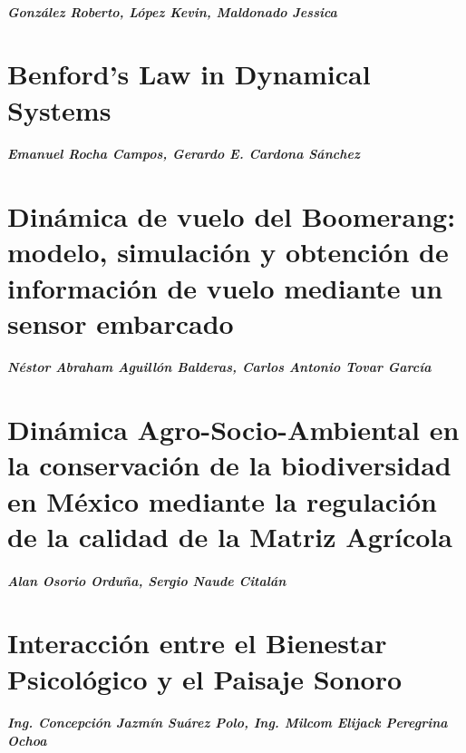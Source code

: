     \paragraph{González Roberto, López Kevin, Maldonado Jessica}
    

    \chapter{Benford's Law in Dynamical Systems}
    \paragraph{Emanuel Rocha Campos, Gerardo E. Cardona Sánchez}
    

    \chapter{Dinámica de vuelo del Boomerang: modelo, simulación y obtención de información de vuelo mediante un sensor embarcado}
    \paragraph{Néstor Abraham Aguillón Balderas, Carlos Antonio Tovar García}
    

    \chapter{Dinámica Agro-Socio-Ambiental en la conservación de la biodiversidad en México mediante la regulación de la calidad de la Matriz Agrícola}
    \paragraph{Alan Osorio Orduña, Sergio Naude Citalán}
    

    \chapter{Interacción entre el Bienestar Psicológico y el Paisaje Sonoro}
    \paragraph{Ing. Concepción Jazmín Suárez Polo, Ing. Milcom Elijack Peregrina Ochoa}
    

